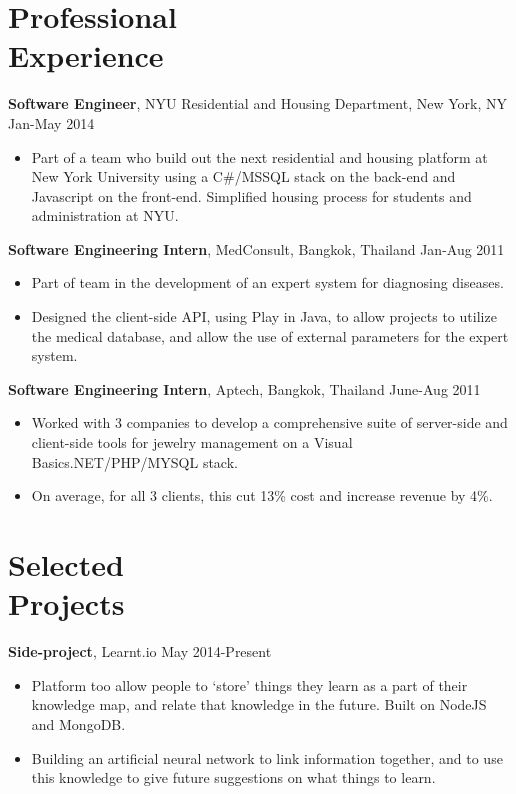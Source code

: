 \documentclass[margin]{res}
\begin{document}
 
\begin{resume}
 
\section{Professional \\ Experience}

{\bf Software Engineer}, NYU Residential and Housing Department, New York, NY \hfill Jan-May 2014
\begin{itemize} \itemsep -2pt
\item Part of a team who build out the next residential and housing platform at New York University using a C\#/MSSQL stack on the back-end and Javascript on the front-end. Simplified housing process for students and administration at NYU.
\end{itemize}

{\bf Software Engineering Intern}, MedConsult, Bangkok, Thailand \hfill Jan-Aug 2011
\begin{itemize} \itemsep -2pt
\item Part of team in the development of an expert system for diagnosing diseases.
\item Designed the client-side API, using Play in Java, to allow projects to utilize the medical database, and allow the use of external parameters for the expert system.
\end{itemize}

{\bf Software Engineering Intern}, Aptech, Bangkok, Thailand \hfill June-Aug 2011
\begin{itemize} \itemsep -2pt
\item Worked with 3 companies to develop a comprehensive suite of server-side and client-side tools for jewelry management on a Visual Basics.NET/PHP/MYSQL stack. 
\item On average, for all 3 clients, this cut 13\% cost and increase revenue by 4\%.
\end{itemize}
 
\section{Selected \\ Projects}
 
{\bf Side-project}, Learnt.io \hfill May 2014-Present
\begin{itemize} \itemsep -2pt 
\item Platform too allow people to `store' things they learn as a part of their knowledge map, and relate that knowledge in the future. Built on NodeJS and MongoDB.
\item Building an artificial neural network to link information together, and to use this knowledge to give future suggestions on what things to learn.
\end{itemize}


\end{resume}
\end{document}
